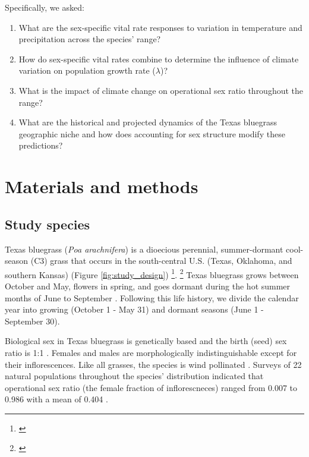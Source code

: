 \documentclass[12pt]{article}\usepackage[]{graphicx}\usepackage[dvipsnames]{xcolor}
\newcommand{\tom}[2]{{\color{red}{#1}}\footnote{\textit{\color{red}{#2}}}}
\newcommand{\jacob}[2]{{\color{blue}{#1}}\footnote{\textit{\color{blue}{#2}}}}
\begin{document}
Specifically, we asked: 
\begin{enumerate}
	\item What are the sex-specific vital rate responses to variation in temperature and precipitation across the species' range?
	\item How do sex-specific vital rates combine to determine the influence of climate variation on population growth rate ($\lambda$)?
	\item What is the impact of climate change on operational sex ratio throughout the range?
	\item What are the historical and projected dynamics of the Texas bluegrass geographic niche and how does accounting for sex structure modify these predictions?
\end{enumerate}

\section*{Materials and methods}
\subsection*{Study species}
Texas bluegrass (\textit{Poa arachnifera}) is a dioecious perennial, summer-dormant cool-season (C3) grass that occurs in the south-central U.S. (Texas, Oklahoma, and southern Kansas) (Figure \ref{fig:study_design}) \citep{hitchcock1971manual}\jacob{}{I have updated the map}. 
\tom{}{If you are showing all these maps here is no need to report the climate values in the text.}
Texas bluegrass grows between October and May, flowers in spring, and goes dormant during the hot summer months of June to September \citep{kindiger2004interspecific}. 
Following this life history, we divide the calendar year into growing (October 1 - May 31) and dormant seasons (June 1 - September 30). 

Biological sex in Texas bluegrass is genetically based and the birth (seed) sex ratio is 1:1 \citep{renganayaki2005identification}. 
Females and males are morphologically indistinguishable except for their inflorescences. 
Like all grasses, the species is wind pollinated \citep{hitchcock1971manual}. 
Surveys of 22 natural populations throughout the species' distribution indicated that operational sex ratio (the female fraction of inflorescneces) ranged from 0.007 to 0.986 with a mean of 0.404 \citep{miller2022two}. 
\end{document}
